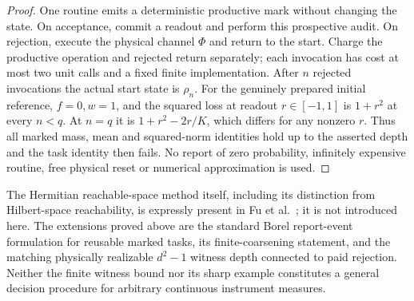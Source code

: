 \begin{proof}
One routine emits a deterministic productive mark without changing the state. On acceptance, commit a readout and perform this prospective audit. On rejection, execute the physical channel $\Phi$ and return to the start. Charge the productive operation and rejected return separately; each invocation has cost at most two unit calls and a fixed finite implementation. After $n$ rejected invocations the actual start state is $\rho_n$. For the genuinely prepared initial reference, $f=0,w=1$, and the squared loss at readout $r\in[-1,1]$ is $1+r^2$ at every $n<q$. At $n=q$ it is $1+r^2-2r/K$, which differs for any nonzero $r$. Thus all marked mass, mean and squared-norm identities hold up to the asserted depth and the task identity then fails. No report of zero probability, infinitely expensive routine, free physical reset or numerical approximation is used.
\end{proof}

The Hermitian reachable-space method itself, including its distinction from Hilbert-space reachability, is expressly present in Fu et al.\ \cite{Fu24}; it is not introduced here. The extensions proved above are the standard Borel report-event formulation for reusable marked tasks, its finite-coarsening statement, and the matching physically realizable $d^2-1$ witness depth connected to paid rejection. Neither the finite witness bound nor its sharp example constitutes a general decision procedure for arbitrary continuous instrument measures.

